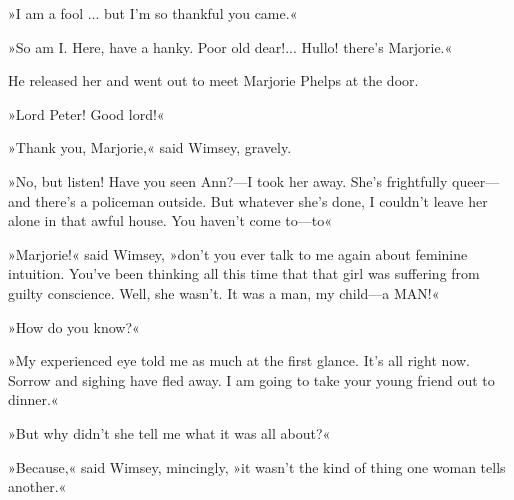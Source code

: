 »I am a fool ... but I'm so thankful you came.«

»So am I. Here, have a hanky. Poor old dear!... Hullo! there's Marjorie.«

He released her and went out to meet Marjorie Phelps at the door.

»Lord Peter! Good lord!«

»Thank you, Marjorie,« said Wimsey, gravely.

»No, but listen! Have you seen Ann?---I took her away. She's frightfully queer\allowbreak---\allowbreak and there's a policeman outside. But whatever she's done, I couldn't leave her alone in that awful house. You haven't come to\allowbreak---\allowbreak to\longdash«

»Marjorie!« said Wimsey, »don't you ever talk to me again about feminine intuition. You've been thinking all this time that that girl was suffering from guilty conscience. Well, she wasn't. It was a man, my child\allowbreak---\allowbreak a MAN!«

»How do you know?«

»My experienced eye told me as much at the first glance. It's all right now. Sorrow and sighing have fled away. I am going to take your young friend out to dinner.«

»But why didn't she tell me what it was all about?«

»Because,« said Wimsey, mincingly, »it wasn't the kind of thing one woman tells another.«